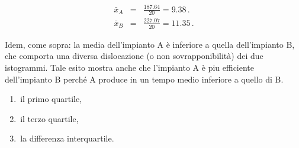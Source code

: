 \documentclass[
  11pt,
]{book}
\providecommand{\tightlist}{%
  \setlength{\itemsep}{0pt}\setlength{\parskip}{0pt}}
\theoremstyle{mytheoremstyle}
\theoremstyle{mydefstyle}
\newenvironment{sol}
  {
  \begin{tcolorbox}[enhanced,breakable,arc=0.1mm,boxrule=1pt,colback=white,colframe=iblue,
  title=\bf \fontfamily{lmss}\selectfont \hspace{.5 cm} Soluzione,drop fuzzy shadow]

}{
\end{tcolorbox}
  }
\begin{document}
\begin{sol}
\begin{eqnarray*}
\bar{x}_{A} &=& \frac{187.64} {20} = 9.38 \,. \\
\bar{x}_{B} &=& \frac{227.07} {20} = 11.35 \,.
\end{eqnarray*}

Idem, come sopra: la media dell'impianto A è inferiore a quella
dell'impianto B, che comporta una diversa dislocazione (o non
sovrapponibilità) dei due istogrammi.
Tale esito mostra anche che l'impianto A è pi\textquotesingle u efficiente
dell'impianto B perché A produce in un tempo medio inferiore
a quello di B.

\end{sol}

\begin{enumerate}
\def\labelenumi{\alph{enumi}.}
\setcounter{enumi}{3}
\tightlist
\item
  \(\,\)il primo quartile,
\item
  \(\,\)il terzo quartile,
\item
  \(\,\)la differenza interquartile.
\end{enumerate}
\end{document}
